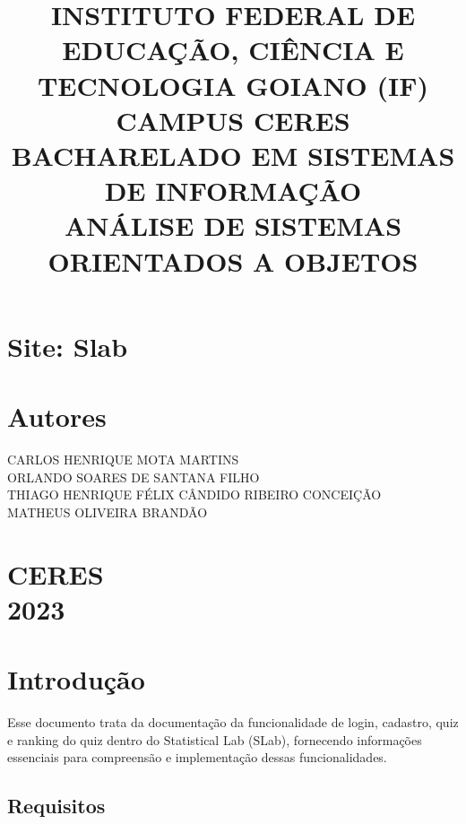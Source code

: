\documentclass{article}
\begin{document}
\title{INSTITUTO FEDERAL DE EDUCAÇÃO, CIÊNCIA E TECNOLOGIA GOIANO (IF)\\ CAMPUS CERES\\ BACHARELADO EM SISTEMAS DE INFORMAÇÃO\\ANÁLISE DE SISTEMAS ORIENTADOS A OBJETOS}
\doublespacing
\date{}
\maketitle
\vspace{50pt}

\section*{Site: Slab}
\vspace{70pt}

\begin{center}
 \large
 \section*{Autores} 
 CARLOS HENRIQUE MOTA MARTINS\\
 ORLANDO SOARES DE SANTANA FILHO \\
 THIAGO HENRIQUE FÉLIX CÂNDIDO RIBEIRO CONCEIÇÃO\\
 MATHEUS OLIVEIRA BRANDÃO\\
 
 
\section*{CERES\\2023}
\vspace{70pt}

\tableofcontents
\end{center}
\vspace{290pt}

\section{Introdução}
{Esse documento trata da documentação da funcionalidade de login, cadastro, quiz e ranking do quiz dentro do Statistical Lab (SLab), fornecendo informações essenciais para compreensão e implementação dessas funcionalidades.}
\vspace{40pt}



\subsection{Requisitos}
\vspace{30pt}
\end{document}
